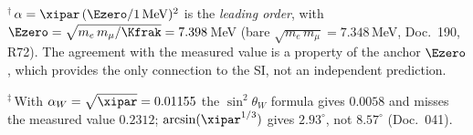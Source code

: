 \begin{table}[htbp]
  \centering
  \caption{The surviving dimensionless inputs of physics and their derivation from
           the single parameter $\xipar=\tfrac{4}{3}\times10^{-4}$. All relations
           are sourced.}
  \label{tab:xi-inputs-en}
  {\footnotesize\setlength{\tabcolsep}{4pt}
  }

  \medskip
  \footnotesize
  $^{\dagger}$\,$\alpha=\xipar\,(\Ezero/1\,\mathrm{MeV})^2$ is the \emph{leading order},
  with $\Ezero=\sqrt{m_e\,m_\mu/\Kfrak}=7{.}398$\,MeV (bare $\sqrt{m_e\,m_\mu}=7{.}348$\,MeV, Doc.~190, R72). The agreement with the measured value is a property of the anchor $\Ezero$, which provides the only connection to the SI, not an independent prediction.\par
  $^{\ddagger}$\,With $\alpha_W = \sqrt{\xipar} = 0{.}01155$ the $\sin^2\theta_W$ formula gives $0{.}0058$ and misses the measured value $0{.}2312$; $\arcsin(\xipar^{1/3})$ gives $2{.}93^\circ$, not $8{.}57^\circ$ (Doc.~041).
 

\end{table}
